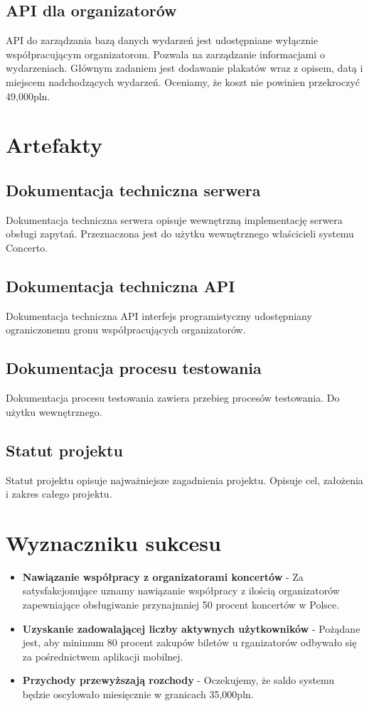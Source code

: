 \documentclass[10pt]{dokument-ppi}
\begin{document}
\subsection{API dla organizatorów}
API do zarządzania bazą danych wydarzeń jest udostępniane wyłącznie współpracującym organizatorom. Pozwala na zarządzanie informacjami o wydarzeniach. Głównym zadaniem jest dodawanie plakatów wraz z opisem, datą i miejscem nadchodzących wydarzeń. Oceniamy, że koszt nie powinien przekroczyć 49,000pln.

\section{Artefakty}

\subsection{Dokumentacja techniczna serwera}
Dokumentacja techniczna serwera opisuje wewnętrzną implementację serwera obsługi zapytań. Przeznaczona jest do użytku wewnętrznego właścicieli systemu Concerto.

\subsection{Dokumentacja techniczna API}
Dokumentacja techniczna API interfejs programistyczny udostępniany ograniczonemu gronu współpracujących organizatorów.

\subsection{Dokumentacja procesu testowania}
Dokumentacja procesu testowania zawiera przebieg procesów testowania. Do użytku wewnętrznego.

\subsection{Statut projektu}
Statut projektu opisuje najważniejsze zagadnienia projektu. Opisuje cel, założenia i zakres całego projektu.

\section{Wyznaczniku sukcesu}

\begin{itemize}
  \item \textbf{Nawiązanie współpracy z organizatorami koncertów} - Za satysfakcjonujące uznamy nawiązanie współpracy z ilością organizatorów zapewniające obsługiwanie przynajmniej 50 procent koncertów w Polsce.

  \item \textbf{Uzyskanie zadowalającej liczby aktywnych użytkowników} - Pożądane jest, aby minimum 80 procent zakupów biletów u rganizatorów odbywało się za pośrednictwem aplikacji mobilnej.
  
  \item \textbf{Przychody przewyższają rozchody} - Oczekujemy, że saldo systemu będzie oscylowało miesięcznie w granicach 35,000pln.
\end{itemize}
\end{document}
